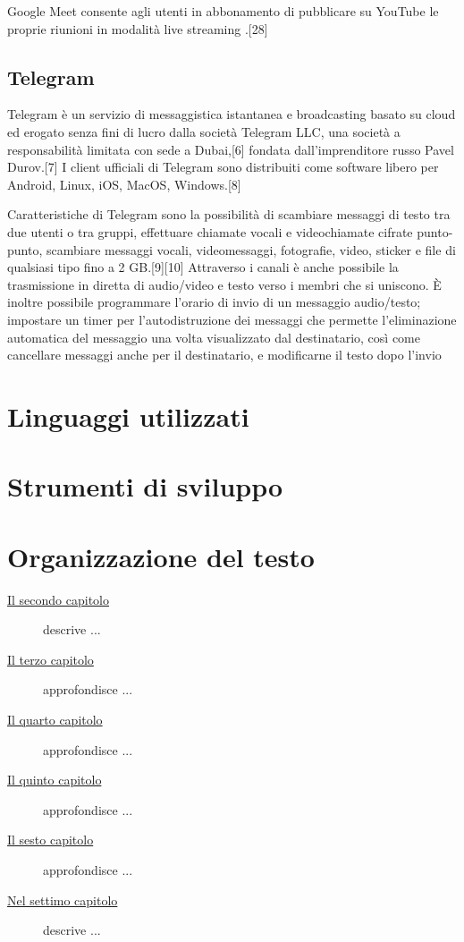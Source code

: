 Google Meet consente agli utenti in abbonamento di pubblicare su YouTube le proprie riunioni in modalità live streaming .[28]
\subsection{Telegram}
Telegram è un servizio di messaggistica istantanea e broadcasting basato su cloud ed erogato senza fini di lucro dalla società Telegram LLC, una società a responsabilità limitata con sede a Dubai,[6] fondata dall'imprenditore russo Pavel Durov.[7] I client ufficiali di Telegram sono distribuiti come software libero per Android, Linux, iOS, MacOS, Windows.[8]

Caratteristiche di Telegram sono la possibilità di scambiare messaggi di testo tra due utenti o tra gruppi, effettuare chiamate vocali e videochiamate cifrate punto-punto, scambiare messaggi vocali, videomessaggi, fotografie, video, sticker e file di qualsiasi tipo fino a 2 GB.[9][10] Attraverso i canali è anche possibile la trasmissione in diretta di audio/video e testo verso i membri che si uniscono. È inoltre possibile programmare l’orario di invio di un messaggio audio/testo; impostare un timer per l'autodistruzione dei messaggi che permette l'eliminazione automatica del messaggio una volta visualizzato dal destinatario, così come cancellare messaggi anche per il destinatario, e modificarne il testo dopo l'invio
\section{Linguaggi utilizzati}

\section{Strumenti di sviluppo}

\section{Organizzazione del testo}

\begin{description}
    \item[{\hyperref[cap:processi-metodologie]{Il secondo capitolo}}] descrive ...
    
    \item[{\hyperref[cap:descrizione-stage]{Il terzo capitolo}}] approfondisce ...
    
    \item[{\hyperref[cap:analisi-requisiti]{Il quarto capitolo}}] approfondisce ...
    
    \item[{\hyperref[cap:progettazione-codifica]{Il quinto capitolo}}] approfondisce ...
    
    \item[{\hyperref[cap:verifica-validazione]{Il sesto capitolo}}] approfondisce ...
    
    \item[{\hyperref[cap:conclusioni]{Nel settimo capitolo}}] descrive ...
\end{description}

